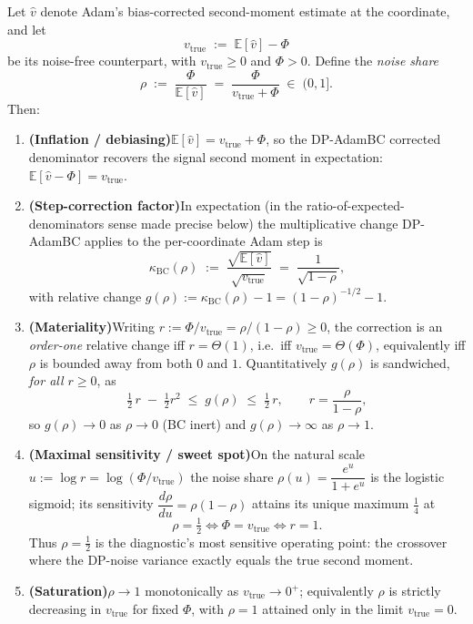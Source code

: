 \begin{theorem}\label{thm:rho}
Let $\hat v$ denote Adam's bias-corrected second-moment estimate at the coordinate, and let
\[
v_{\mathrm{true}} \;:=\; \mathbb E[\hat v]-\Phi
\]
be its noise-free counterpart, with $v_{\mathrm{true}}\ge 0$ and $\Phi>0$. Define the \emph{noise share}
\[
\rho \;:=\; \frac{\Phi}{\mathbb E[\hat v]} \;=\; \frac{\Phi}{v_{\mathrm{true}}+\Phi}\;\in\;(0,1].
\]
Then:
\begin{enumerate}[leftmargin=2.4em,labelsep=0.4em,itemsep=4pt]
\item[\textnormal{(i)}] \textbf{(Inflation / debiasing)}\enspace  $\mathbb E[\hat v]=v_{\mathrm{true}}+\Phi$, so the DP-AdamBC corrected denominator recovers the signal second moment in expectation: $\mathbb E[\hat v-\Phi]=v_{\mathrm{true}}$.
\item[\textnormal{(ii)}] \textbf{(Step-correction factor)}\enspace  In expectation (in the ratio-of-expected-denominators sense made precise below) the multiplicative change DP-AdamBC applies to the per-coordinate Adam step is
\[
\kappa_{\mathrm{BC}}(\rho)\;:=\;\frac{\sqrt{\mathbb E[\hat v]}}{\sqrt{v_{\mathrm{true}}}}\;=\;\frac1{\sqrt{1-\rho}},
\]
with relative change $g(\rho):=\kappa_{\mathrm{BC}}(\rho)-1=(1-\rho)^{-1/2}-1$.
\item[\textnormal{(iii)}] \textbf{(Materiality)}\enspace  Writing $r:=\Phi/v_{\mathrm{true}}=\rho/(1-\rho)\ge0$, the correction is an \emph{order-one} relative change iff $r=\Theta(1)$, i.e.\ iff $v_{\mathrm{true}}=\Theta(\Phi)$, equivalently iff $\rho$ is bounded away from both $0$ and $1$. Quantitatively $g(\rho)$ is sandwiched, \emph{for all $r\ge 0$}, as
\[
\tfrac12\,r \;-\;\tfrac12 r^2\;\le\;g(\rho)\;\le\;\tfrac12\, r ,\qquad r=\frac{\rho}{1-\rho},
\]
so $g(\rho)\to 0$ as $\rho\to 0$ (BC inert) and $g(\rho)\to\infty$ as $\rho\to 1$.
\item[\textnormal{(iv)}] \textbf{(Maximal sensitivity / sweet spot)}\enspace  On the natural scale $u:=\log r=\log(\Phi/v_{\mathrm{true}})$ the noise share $\rho(u)=\dfrac{e^{u}}{1+e^{u}}$ is the logistic sigmoid; its sensitivity $\dfrac{d\rho}{du}=\rho(1-\rho)$ attains its unique maximum $\tfrac14$ at
\[
\rho=\tfrac12 \iff \Phi=v_{\mathrm{true}} \iff r=1 .
\]
Thus $\rho=\tfrac12$ is the diagnostic's most sensitive operating point: the crossover where the DP-noise variance exactly equals the true second moment.
\item[\textnormal{(v)}] \textbf{(Saturation)}\enspace  $\rho\to 1$ monotonically as $v_{\mathrm{true}}\to 0^{+}$; equivalently $\rho$ is strictly decreasing in $v_{\mathrm{true}}$ for fixed $\Phi$, with $\rho=1$ attained only in the limit $v_{\mathrm{true}}=0$.
\end{enumerate}
\end{theorem}

